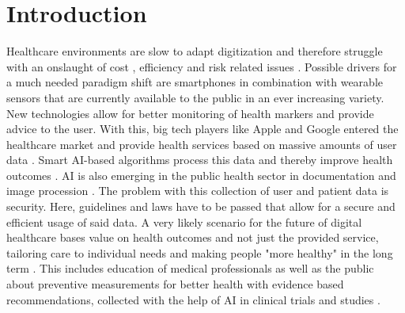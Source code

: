 \section{Introduction}
Healthcare environments are slow to adapt digitization \cite{industryDigitalization} and therefore struggle with an onslaught of cost \cite{EIU2016}, efficiency \cite{gopal2019digital} and risk related issues \cite{rodriguez2002illegible}. Possible drivers for a much needed paradigm shift are smartphones in combination with wearable sensors that are currently available to the public in an ever increasing variety. New technologies allow for better monitoring of health markers and provide advice to the user. With this, big tech players like Apple and Google entered the healthcare market and provide health services based on massive amounts of user data \cite{appleHealth}. Smart AI-based algorithms process this data and thereby improve health outcomes \cite{villar2015improving}. AI is also emerging in the public health sector in documentation and image procession \cite{kiKroenung}. The problem with this collection of user and patient data is security. Here, guidelines and laws have to be passed that allow for a secure and efficient usage of said data. A very likely scenario for the future of digital healthcare bases value on health outcomes and not just the provided service, tailoring care to individual needs and making people "more healthy" in the long term \cite{putera2017redefining}. This includes education of medical professionals \cite{adams2010nutrition} as well as the public about preventive measurements for better health with evidence based recommendations, collected with the help of AI in clinical trials and studies \cite{rehme2014identifying}.

